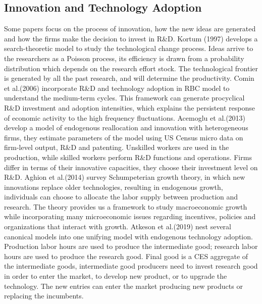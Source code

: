 \documentclass{article}
\newcommand{\1}{\mathbb{1}}
\begin{document}
\subsection{Innovation and Technology Adoption}
Some papers focus on the process of innovation, how the new ideas are generated and how the firms make the decision to invest in R\&D. 
Kortum (1997)\cite{Kortum1997} develops a search-theoretic model to study the technological change process. Ideas arrive to the researchers as a Poisson process, its efficiency is drawn from a probability distribution which depends on the research effort stock. The technological frontier is generated by all the past research, and will determine the productivity. 
Comin et al.(2006)\cite{Cominetal2006} incorporate R\&D and technology adoption in RBC model to understand the medium-term cycles. This framework can generate procyclical R\&D investment and adoption intensities, which explains the persistent response of economic activity to the high frequency fluctuations. 
Acemoglu et al.(2013)\cite{Acemogluetal2013} develop a model of endogenous reallocation and innovation with heterogeneous firms, they estimate parameters of the model using US Census micro data on firm-level output, R\&D and patenting. Unskilled workers are used in the production, while skilled workers perform R\&D functions and operations. Firms differ in terms of their innovative capacities, they choose their investment level on R\&D. 
Aghion et al.(2014)\cite{Aghionetal2014} survey Schumpeterian growth theory, in which new innovations replace older technologies, resulting in endogenous growth, individuals can choose to allocate the labor supply between production and research. The theory provides us a framework to study macroeconomic growth while incorporating many microeconomic issues regarding incentives, policies and organizations that interact with growth.
Atkeson et al.(2019)\cite{Atkesonetal2019} nest several canonical models into one unifying model with endogenous technology adoption. Production labor hours are used to produce the intermediate good; research labor hours are used to produce the research good. Final good is a CES aggregate of the intermediate goods, intermediate good producers need to invest research good in order to enter the market, to develop new product, or to upgrade the technology. The new entries can enter the market producing new products or replacing the incumbents. \\
\end{document}
